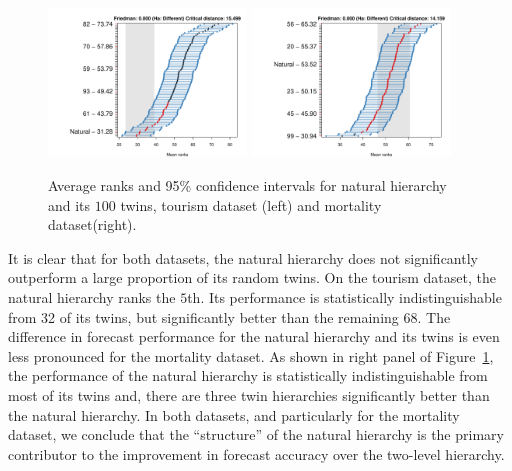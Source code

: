\documentclass[a4paper,review,12pt,authoryear]{elsarticle}
\begin{document}
\begin{figure}[h!]
    \centering
\includegraphics[width=0.47\textwidth]{figures/hierarchy_rmsse/tourism/P2_natural_vs_pn_h12.pdf}
    \centering    \includegraphics[width=0.47\textwidth]{figures/hierarchy_rmsse/mortality/P2_natural_vs_pn_h12.pdf}
    \caption{\label{fig:P2_tourism}Average ranks and 95\% confidence intervals for natural hierarchy and its $100$ twins, tourism dataset (left) and mortality dataset(right).}
\end{figure}
 

It is clear that for both datasets, the natural hierarchy does not significantly outperform a large proportion of its random twins. 
On the tourism dataset, the natural hierarchy ranks the $5$th. Its performance is statistically indistinguishable from 32 of its twins, but significantly better than the remaining 68. The difference in forecast performance for the natural hierarchy and its twins is even less pronounced for the mortality dataset. As shown in right panel of Figure~\ref{fig:P2_tourism}, the performance of the natural hierarchy is statistically indistinguishable from most of its twins and, there are three twin hierarchies significantly better than the natural hierarchy. %
In both datasets, and particularly for the mortality dataset, we conclude that the ``structure'' of the natural hierarchy is the primary contributor to the improvement in forecast accuracy over the two-level hierarchy.
\end{document}
